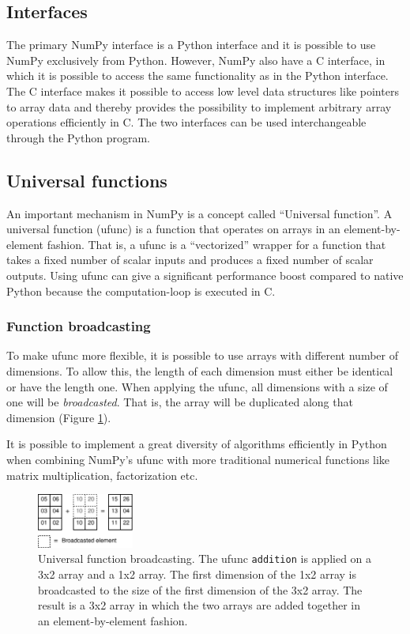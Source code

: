 \documentclass[10pt]{article}
\begin{document}
\subsection{Interfaces}
The primary NumPy interface is a Python interface and it is possible to use NumPy exclusively from Python. However, NumPy also have a C interface, in which it is possible to access the same functionality as in the Python interface. The C interface makes it possible to access low level data structures like pointers to array data and thereby provides the possibility to implement arbitrary array operations efficiently in C. The two interfaces can be used interchangeable through the Python program.

\subsection{Universal functions}
An important mechanism in NumPy is a concept called “Universal function”. A universal function (ufunc) is a function that operates on arrays in an element-by-element fashion. That is, a ufunc is a “vectorized” wrapper for a function that takes a fixed number of scalar inputs and produces a fixed number of scalar outputs. Using ufunc can give a significant performance boost compared to native Python because the computation-loop is executed in C.

\subsubsection{Function broadcasting}
To make ufunc more flexible, it is possible to use arrays with different number of dimensions. To allow this, the length of each dimension must either be identical or have the length one. When applying the ufunc, all dimensions with a size of one will be \emph{broadcasted}. That is, the array will be duplicated along that dimension (Figure \ref{fig:ufunc_broadcast}).

It is possible to implement a great diversity of algorithms efficiently in Python when combining NumPy's ufunc with more traditional numerical functions like matrix multiplication, factorization etc.

\begin{figure}
 \centering
 \includegraphics[width=120px]{gfx/ufunc_broadcast}
 \caption{Universal function broadcasting. The ufunc \texttt{addition} is applied on a 3x2 array and a 1x2 array. The first dimension of the 1x2 array is broadcasted to the size of the first dimension of the 3x2 array. The result is a 3x2 array in which the two arrays are added together in an element-by-element fashion.}
 \label{fig:ufunc_broadcast}
\end{figure}
\end{document}
